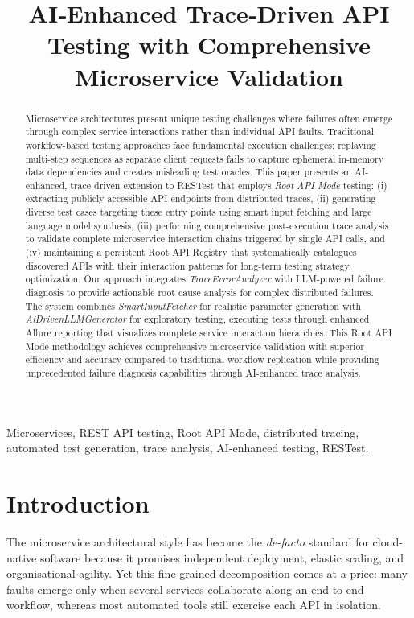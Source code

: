 \documentclass[conference]{IEEEtran}
\title{AI‑Enhanced Trace‑Driven API Testing with Comprehensive Microservice Validation}
\author{\IEEEauthorblockN{Tingshuo Miao}\IEEEauthorblockA{Department of Computer Science\\Baylor University, USA\\Email: tingshuo\_miao2@baylor.edu}}
\begin{document}
\maketitle

\begin{abstract}
Microservice architectures present unique testing challenges where failures often emerge through complex service interactions rather than individual API faults. Traditional workflow-based testing approaches face fundamental execution challenges: replaying multi-step sequences as separate client requests fails to capture ephemeral in-memory data dependencies and creates misleading test oracles. This paper presents an AI-enhanced, trace-driven extension to RESTest that employs \emph{Root API Mode} testing: (i) extracting publicly accessible API endpoints from distributed traces, (ii) generating diverse test cases targeting these entry points using smart input fetching and large language model synthesis, (iii) performing comprehensive post-execution trace analysis to validate complete microservice interaction chains triggered by single API calls, and (iv) maintaining a persistent Root API Registry that systematically catalogues discovered APIs with their interaction patterns for long-term testing strategy optimization. Our approach integrates \textit{TraceErrorAnalyzer} with LLM-powered failure diagnosis to provide actionable root cause analysis for complex distributed failures. The system combines \textit{SmartInputFetcher} for realistic parameter generation with \textit{AiDrivenLLMGenerator} for exploratory testing, executing tests through enhanced Allure reporting that visualizes complete service interaction hierarchies. This Root API Mode methodology achieves comprehensive microservice validation with superior efficiency and accuracy compared to traditional workflow replication while providing unprecedented failure diagnosis capabilities through AI-enhanced trace analysis.
\end{abstract}

\begin{IEEEkeywords}
Microservices, REST API testing, Root API Mode, distributed tracing, automated test generation, trace analysis, AI-enhanced testing, RESTest.
\end{IEEEkeywords}

\section{Introduction}
The microservice architectural style has become the \emph{de-facto}
standard for cloud-native software because it promises independent
deployment, elastic scaling, and organisational agility.  Yet this
fine-grained decomposition comes at a price: many faults emerge only
when several services collaborate along an end-to-end workflow, whereas
most automated tools still exercise each API in isolation.
\end{document}
